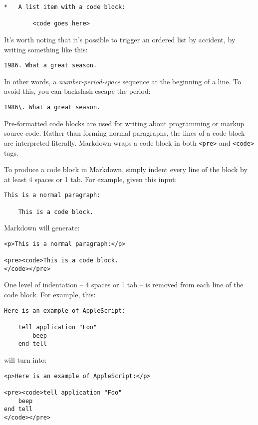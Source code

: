 \begin{verbatim}
*   A list item with a code block:

        <code goes here>
\end{verbatim}

It's worth noting that it's possible to trigger an ordered list by
accident, by writing something like this:

\begin{verbatim}
1986. What a great season.
\end{verbatim}

In other words, a \emph{number-period-space} sequence at the beginning of a
line. To avoid this, you can backslash-escape the period:

\begin{verbatim}
1986\. What a great season.
\end{verbatim}

Pre-formatted code blocks are used for writing about programming or
markup source code. Rather than forming normal paragraphs, the lines
of a code block are interpreted literally. Markdown wraps a code block
in both \texttt{<pre>} and \texttt{<code>} tags.

To produce a code block in Markdown, simply indent every line of the
block by at least 4 spaces or 1 tab. For example, given this input:

\begin{verbatim}
This is a normal paragraph:

    This is a code block.
\end{verbatim}

Markdown will generate:

\begin{verbatim}
<p>This is a normal paragraph:</p>

<pre><code>This is a code block.
</code></pre>
\end{verbatim}

One level of indentation -- 4 spaces or 1 tab -- is removed from each
line of the code block. For example, this:

\begin{verbatim}
Here is an example of AppleScript:

    tell application "Foo"
        beep
    end tell
\end{verbatim}

will turn into:

\begin{verbatim}
<p>Here is an example of AppleScript:</p>

<pre><code>tell application "Foo"
    beep
end tell
</code></pre>
\end{verbatim}

